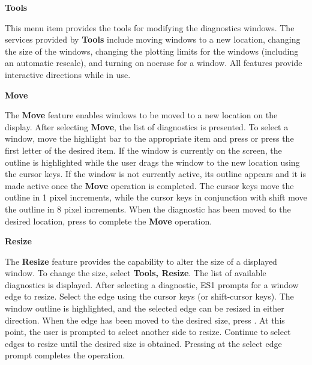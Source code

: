 \begin{section}
\begin{subsection}
{\bf Tools}

   This menu item provides the tools for modifying the diagnostics windows.
   The services provided by {\bf Tools} include moving windows to 
   a new location,
   changing the size of the windows, changing the plotting limits for the
   windows (including an automatic rescale), and turning on noerase for a
   window.  All features provide interactive directions while in use.

\begin{subsubsection}
{\bf Move}

      The {\bf Move} feature enables windows to be moved to a new 
      location on the
      display.  After selecting {\bf Move}, the list of diagnostics 
      is presented.  To
      select a window, move the highlight bar to the appropriate item and press
       or press the first letter of the desired item.  If the
      window is currently on the screen, the outline is highlighted while the
      user drags the window to the new location using the cursor keys.  If the
      window is not currently active, its outline appears and it is made active
      once the {\bf Move} operation is completed.  The cursor keys move the outline
      in 1 pixel increments, while the cursor keys in conjunction with shift
      move the outline in 8 pixel increments.  When the diagnostic has been
      moved to the desired location, press  to complete the {\bf Move}
      operation.
\end{subsubsection}

\begin{subsubsection}
{\bf Resize}

      The {\bf Resize} feature provides the capability to alter the size of a
      displayed window.  To change the size, select {\bf Tools, Resize}.  The list of
      available diagnostics is displayed.  After selecting a diagnostic, ES1
      prompts for a window edge to resize.  Select the edge using the cursor
      keys (or shift-cursor keys).  The window outline is highlighted, and the
      selected edge can be resized in either direction.  When the edge has been
      moved to the desired size, press .  At this point, the user
      is prompted to select another side to resize.  Continue to select edges
      to resize until the desired size is obtained.  Pressing  at
      the select edge prompt completes the operation.
\end{subsubsection}


\end{subsection}
\end{section}
